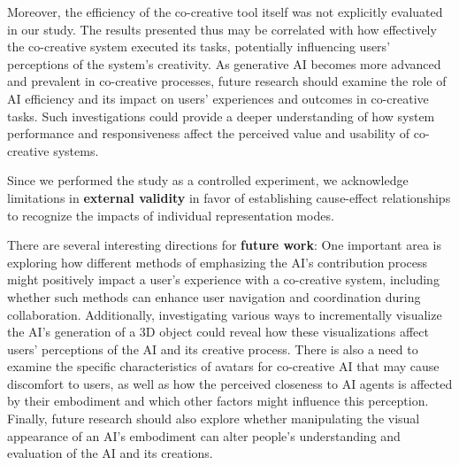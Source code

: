 Moreover, the efficiency of the co-creative tool itself was not explicitly evaluated in our study. 
The results presented thus may be correlated with how effectively the co-creative system executed its tasks, potentially influencing users' perceptions of the system's creativity. 
As generative AI becomes more advanced and prevalent in co-creative processes, future research should examine the role of AI efficiency and its impact on users' experiences and outcomes in co-creative tasks. Such investigations could provide a deeper understanding of how system performance and responsiveness affect the perceived value and usability of co-creative systems.




Since we performed the study as a controlled experiment, we acknowledge limitations in \textbf{external validity} in favor of establishing cause-effect relationships to recognize the impacts of individual representation modes. %


There are several interesting directions for \textbf{future work}:
One important area is exploring how different methods of emphasizing the AI's contribution process might positively impact a user's experience with a co-creative system, including whether such methods can enhance user navigation and coordination during collaboration. 
Additionally, investigating various ways to incrementally visualize the AI's generation of a 3D object could reveal how these visualizations affect users' perceptions of the AI and its creative process. 
There is also a need to examine the specific characteristics of avatars for co-creative AI that may cause discomfort to users, as well as how the perceived closeness to AI agents is affected by their embodiment and which other factors might influence this perception. 
Finally, future research should also explore whether manipulating the visual appearance of an AI's embodiment can alter people's understanding and evaluation of the AI and its creations.
